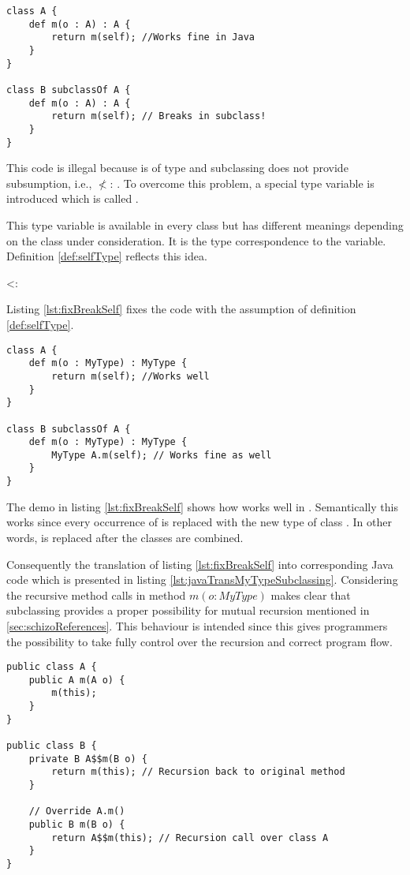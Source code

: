 \begin{lstlisting}[float,language=ooplss,caption=Illegal method m(o : \A) : \emph{Void} in class \B,label=lst:breakSelf]
class A {
	def m(o : A) : A {
		return m(self); //Works fine in Java
	}
}

class B subclassOf A {
	def m(o : A) : A {
		return m(self); // Breaks in subclass!
	}
}
\end{lstlisting}

This code is illegal because \self is of type \B and subclassing does
not provide subsumption, i.e., \B $\nless$: \A. To overcome this problem,
a special type variable is introduced which is called \mytype.

This type variable is available in every class but has different meanings
depending on the class under consideration. It is the type correspondence
to the \self variable. Definition \ref{def:selfType} reflects this idea.

\begin{defn}
	\label{def:selfType}
	\self <: \mytype
\end{defn}

Listing \ref{lst:fixBreakSelf} fixes the code with the assumption of
definition \ref{def:selfType}.

\begin{lstlisting}[float,language=ooplss,caption=Type safe code with \mytype,label=lst:fixBreakSelf]
class A {
	def m(o : MyType) : MyType {
		return m(self); //Works well
	}
}

class B subclassOf A {
	def m(o : MyType) : MyType {
		MyType A.m(self); // Works fine as well
	}
}
\end{lstlisting}

The demo in listing \ref{lst:fixBreakSelf} shows how \mytype works well
in \ooplss.  Semantically this works since every occurrence of \mytype
is replaced with the new type of class \B. In other words, \mytype is
replaced after the classes are combined.

Consequently the translation of listing \ref{lst:fixBreakSelf}
into corresponding Java code which is presented in listing
\ref{lst:javaTransMyTypeSubclassing}. Considering the recursive
method calls in method $m(o : MyType)$ makes clear that subclassing
provides a proper possibility for mutual recursion mentioned in
\cref{sec:schizoReferences}. This behaviour is intended since this gives
programmers the possibility to take fully control over the recursion
and correct program flow.

\begin{lstlisting}[float,caption=Subclassing with \mytype translated in Java,label=lst:javaTransMyTypeSubclassing]
public class A {
	public A m(A o) {
		m(this);
	}
}

public class B {
	private B A$$m(B o) {
		return m(this); // Recursion back to original method
	}

	// Override A.m()
	public B m(B o) {
		return A$$m(this); // Recursion call over class A
	}
}
\end{lstlisting}

